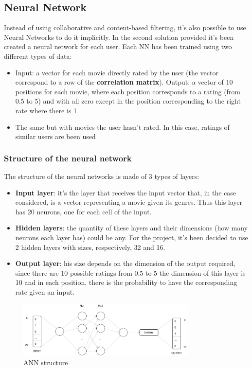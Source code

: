 \documentclass{article}
\begin{document}
\subsection{Neural Network}
Instead of using collaborative and content-based filtering, it's also possible to use Neural Networks to do it implicitly. In the second solution provided it's been created a neural network for each user. Each NN has been trained using two different types of data:

\begin{itemize}
    \item Input: a vector for each movie directly rated by the user (the vector correspond to a row of the \textbf{correlation matrix}).\newline
    Output: a vector of 10 positions for each movie, where each position corresponds to a rating (from 0.5 to 5) and with all zero except in the position corresponding to the right rate where there is 1
    \item The same but with movies the user hasn't rated. In this case, ratings of similar users are been used
\end{itemize}

\subsubsection{Structure of the neural network}

The structure of the neural networks is made of 3 types of layers:
\begin{itemize}
    \item \textbf{Input layer}: it's the layer that receives the input vector that, in the case considered, is a vector representing a movie given its genres. Thus this layer has 20 neurons, one for each cell of the input.
    \item \textbf{Hidden layers}: the quantity of these layers and their dimensions (how many neurons each layer has) could be any. For the project, it's been decided to use 2 hidden layers with sizes, respectively, 32 and 16.
    \item \textbf{Output layer}: his size depends on the dimension of the output required, since there are 10 possible ratings from 0.5 to 5 the dimension of this layer is 10 and in each position, there is the probability to have the corresponding rate given an input.
\end{itemize}
\begin{figure}[ht]
      \begin{center}
            \includegraphics[width=0.8\textwidth]{images/ANN_img.png}
      \end{center}
      \caption{ANN structure}
      \label{fig: ANN structure}
\end{figure}
\end{document}
